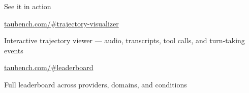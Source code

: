 \documentclass[aspectratio=169]{beamer}
\begin{document}
{
\begin{frame}[plain]
  \centering\vfill
  {\fontsize{22}{28}\selectfont\interlight\textcolor{SierraCharcoal}{%
    See it in action%
  }}

  \vspace{2em}

  {\fontsize{14}{18}\selectfont\intermedium\textcolor{SierraGreen}{%
    \href{https://taubench.com/\#trajectory-visualizer?model=xai-realtime_sierra_2026-03-03\&domain=airline\&task=0}{taubench.com/\#trajectory-visualizer}%
  }}

  \vspace{0.5em}
  {\fontsize{10}{13}\selectfont\interregular\textcolor{SierraTaupe}{%
    Interactive trajectory viewer --- audio, transcripts, tool calls, and turn-taking events%
  }}

  \vspace{1.5em}

  {\fontsize{14}{18}\selectfont\intermedium\textcolor{SierraGreen}{%
    \href{https://taubench.com/\#leaderboard}{taubench.com/\#leaderboard}%
  }}

  \vspace{0.5em}
  {\fontsize{10}{13}\selectfont\interregular\textcolor{SierraTaupe}{%
    Full leaderboard across providers, domains, and conditions%
  }}

  \vfill
\end{frame}
}

\end{document}
